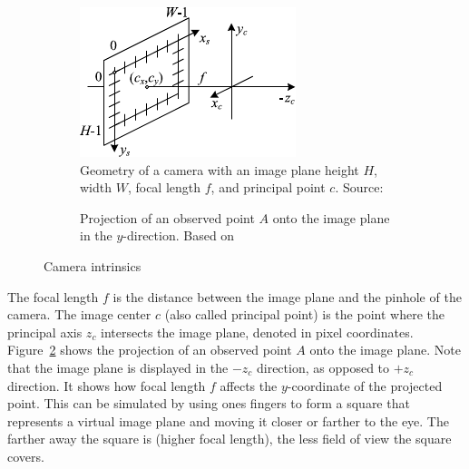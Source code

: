 \begin{figure}[ht!]
    \centering
    \begin{subfigure}[t]{0.45\textwidth} %
        \includegraphics[width=1\linewidth]{images/intrinsics}
        \caption{Geometry of a camera with an image plane height $H$, width $W$, focal length $f$, and principal point $c$. Source: \cite{szeliski_computer_nodate}}
        \label{fig:intrinsics-3d}
    \end{subfigure}%
    \hspace{0.05\textwidth} %
    \begin{subfigure}[t]{0.45\textwidth} %
        \resizebox{\linewidth}{!}{
            
        }
        \caption{Projection of an observed point $A$ onto the image plane in the $y$-direction. Based on \cite{kris_kitani_computer_2017}}
        \label{fig:intrinsics-2d}
    \end{subfigure}%
    \caption{Camera intrinsics}
    \label{fig:intrinsics}
\end{figure}

The focal length $f$ is the distance between the image plane and the pinhole of the camera.
The image center $c$ (also called principal point) is the point where the principal axis $z_c$
intersects the image plane, denoted in pixel coordinates.
Figure~\ref{fig:intrinsics-2d} shows the projection of an observed point $A$ onto the image plane.
Note that the image plane is displayed in the $-z_c$ direction, as opposed to $+z_c$ direction.
It shows how focal length $f$ affects the $y$-coordinate of the projected point.
\cite{szeliski_computer_nodate, google_llc_arcore_doc, kris_kitani_computer_2017}
This can be simulated by using ones fingers to form a square that represents a virtual
image plane and moving it closer or farther to the eye.
The farther away the square is (higher focal length), the less field of view the square covers.

